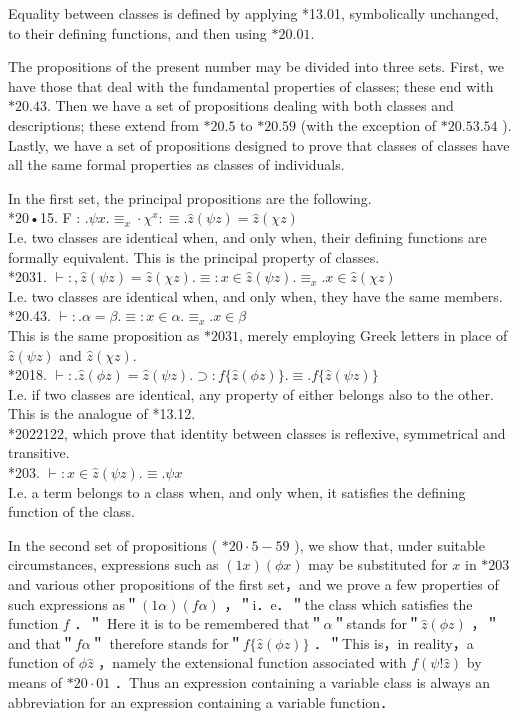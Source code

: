 \documentclass[10pt]{article}
\begin{document}
Equality between classes is defined by applying *13.01, symbolically unchanged, to their defining functions, and then using $* 20.01$.

The propositions of the present number may be divided into three sets. First, we have those that deal with the fundamental properties of classes; these end with $* 20.43$. Then we have a set of propositions dealing with both classes and descriptions; these extend from $* 20.5$ to $* 20.59$ (with the exception of $* 20.53 .54$ ). Lastly, we have a set of propositions designed to prove that classes of classes have all the same formal properties as classes of individuals.

In the first set, the principal propositions are the following.\\
*20•15. F : $. \psi x . \equiv_{x} \cdot \chi^{x}: \equiv . \hat{z}(\psi z)=\hat{z}(\chi z)$\\
I.e. two classes are identical when, and only when, their defining functions are formally equivalent. This is the principal property of classes.\\
*2031. $\vdash:, \hat{z}(\psi z)=\hat{z}(\chi z) . \equiv: x \in \hat{z}(\psi z) . \equiv_{x} . x \in \hat{z}(\chi z)$\\
I.e. two classes are identical when, and only when, they have the same members.\\
*20.43. $\vdash: . \alpha=\beta . \equiv: x \in \alpha . \equiv_{x} . x \in \beta$\\
This is the same proposition as $* 2031$, merely employing Greek letters in place of $\hat{z}(\psi z)$ and $\hat{z}(\chi z)$.\\
*2018. $\vdash: . \hat{z}(\phi z)=\hat{z}(\psi z) . \supset: f\{\hat{z}(\phi z)\} . \equiv . f\{\hat{z}(\psi z)\}$\\
I.e. if two classes are identical, any property of either belongs also to the other. This is the analogue of *13.12.\\
*2022122, which prove that identity between classes is reflexive, symmetrical and transitive.\\
*203. $\vdash: x \in \hat{z}(\psi z) . \equiv . \psi x$\\
I.e. a term belongs to a class when, and only when, it satisfies the defining function of the class.

In the second set of propositions ( $* 20 \cdot 5-59$ ), we show that, under suitable circumstances, expressions such as $(1 x)(\phi x)$ may be substituted for $x$ in $* 203$\\
and various other propositions of the first set，and we prove a few properties of such expressions as＂$(1 \alpha)(f \alpha)$ ，＂i．e．＂the class which satisfies the function $f$ ．＂ Here it is to be remembered that＂$\alpha$＂stands for＂$\hat{z}(\phi z)$ ，＂and that＂$f \alpha$＂ therefore stands for＂$f\{\hat{z}(\phi z)\}$ ．＂This is，in reality，a function of $\phi \hat{z}$ ，namely the extensional function associated with $f(\psi!\hat{z})$ by means of $* 20 \cdot 01$ ．Thus an expression containing a variable class is always an abbreviation for an expression containing a variable function．
\end{document}
